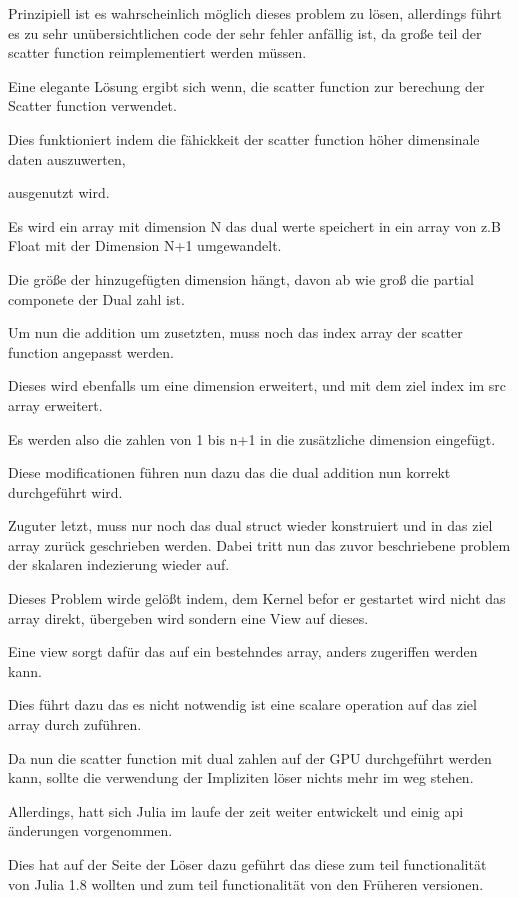 Prinzipiell ist es wahrscheinlich möglich dieses problem zu lösen, allerdings führt es zu sehr unübersichtlichen code der sehr fehler anfällig ist, da große teil der scatter function reimplementiert werden müssen.


Eine elegante Lösung ergibt sich wenn, die scatter function zur berechung der Scatter function verwendet.

Dies funktioniert indem die fähickkeit der scatter function höher dimensinale daten auszuwerten,

ausgenutzt wird. 

Es wird ein array mit dimension N das dual werte speichert in ein array von z.B Float mit der Dimension N+1 umgewandelt. 

Die größe der hinzugefügten dimension hängt, davon ab wie groß die partial componete der Dual zahl ist.

Um nun die addition um zusetzten, muss noch das index array der scatter function angepasst werden.

Dieses wird ebenfalls um eine dimension erweitert, und mit dem ziel index im src array erweitert.

Es werden also die zahlen von 1 bis n+1 in die zusätzliche dimension eingefügt.

Diese modificationen führen nun dazu das die dual addition nun korrekt durchgeführt wird.

Zuguter letzt, muss nur noch das dual struct wieder konstruiert und in das ziel array zurück geschrieben werden. Dabei tritt nun das zuvor beschriebene problem der skalaren indezierung wieder auf.

Dieses Problem wirde gelößt indem, dem Kernel befor er gestartet wird nicht das array direkt, übergeben wird
sondern eine View auf dieses.

Eine view sorgt dafür das auf ein bestehndes array, anders zugeriffen werden kann.

Dies führt dazu das es nicht notwendig ist eine scalare operation auf das ziel array durch zuführen.


Da nun die scatter function mit dual zahlen auf der GPU durchgeführt werden kann, sollte die verwendung der Impliziten löser nichts mehr im weg stehen.

Allerdings, hatt sich Julia im laufe der zeit weiter entwickelt und einig api änderungen vorgenommen.

Dies hat auf der Seite der Löser dazu geführt das diese zum teil functionalität von Julia 1.8 wollten und zum teil functionalität von den Früheren versionen.

